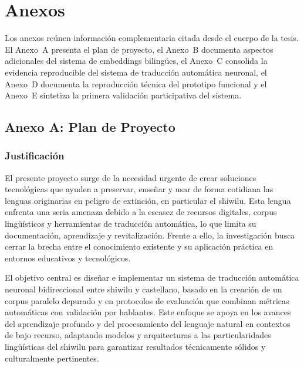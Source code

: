 \documentclass[12pt,a4paper,oneside]{book}
\begin{document}
\printbibliography[title=Referencias, heading=bibintoc]

\appendix
\chapter{Anexos}

Los anexos reúnen información complementaria citada desde el cuerpo de la tesis. El Anexo~A presenta el plan de proyecto, el Anexo~B documenta aspectos adicionales del sistema de embeddings bilingües, el Anexo~C consolida la evidencia reproducible del sistema de traducción automática neuronal, el Anexo~D documenta la reproducción técnica del prototipo funcional y el Anexo~E sintetiza la primera validación participativa del sistema.

\section*{Anexo A: Plan de Proyecto}

\subsection*{Justificación}

El presente proyecto surge de la necesidad urgente de crear soluciones tecnológicas que ayuden a preservar, enseñar y usar de forma cotidiana las lenguas originarias en peligro de extinción, en particular el shiwilu. Esta lengua enfrenta una seria amenaza debido a la escasez de recursos digitales, corpus lingüísticos y herramientas de traducción automática, lo que limita su documentación, aprendizaje y revitalización. Frente a ello, la investigación busca cerrar la brecha entre el conocimiento existente y su aplicación práctica en entornos educativos y tecnológicos.

El objetivo central es diseñar e implementar un sistema de traducción automática neuronal bidireccional entre shiwilu y castellano, basado en la creación de un corpus paralelo depurado y en protocolos de evaluación que combinan métricas automáticas con validación por hablantes. Este enfoque se apoya en los avances del aprendizaje profundo y del procesamiento del lenguaje natural en contextos de bajo recurso, adaptando modelos y arquitecturas a las particularidades lingüísticas del shiwilu para garantizar resultados técnicamente sólidos y culturalmente pertinentes.
\end{document}
